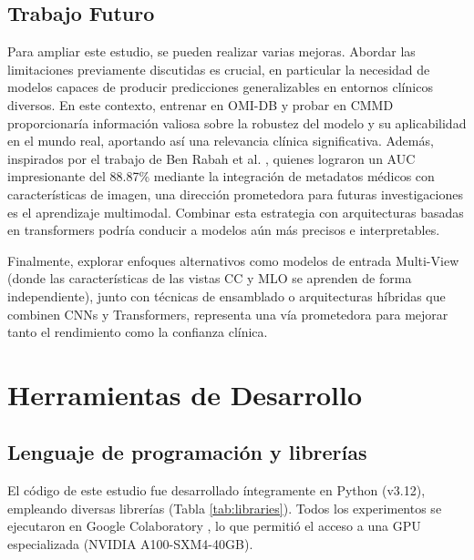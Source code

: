 \documentclass[a4paper,10pt]{book}
\begin{document}
\section{Trabajo Futuro}

Para ampliar este estudio, se pueden realizar varias mejoras. Abordar las limitaciones previamente discutidas es crucial, en particular la necesidad de modelos capaces de producir predicciones generalizables en entornos clínicos diversos. En este contexto, entrenar en OMI-DB y probar en CMMD proporcionaría información valiosa sobre la robustez del modelo y su aplicabilidad en el mundo real, aportando así una relevancia clínica significativa. Además, inspirados por el trabajo de Ben Rabah et al. \cite{ben_rabah_multimodal_2025}, quienes lograron un AUC impresionante del 88.87\% mediante la integración de metadatos médicos con características de imagen, una dirección prometedora para futuras investigaciones es el aprendizaje multimodal. Combinar esta estrategia con arquitecturas basadas en transformers podría conducir a modelos aún más precisos e interpretables.

Finalmente, explorar enfoques alternativos como modelos de entrada Multi-View (donde las características de las vistas CC y MLO se aprenden de forma independiente), junto con técnicas de ensamblado o arquitecturas híbridas que combinen CNNs y Transformers, representa una vía prometedora para mejorar tanto el rendimiento como la confianza clínica.

\appendix

\chapter{Herramientas de Desarrollo}

\section{Lenguaje de programación y librerías}

El código de este estudio fue desarrollado íntegramente en Python (v3.12), empleando diversas librerías (Tabla \ref{tab:libraries}). Todos los experimentos se ejecutaron en Google Colaboratory \cite{GoogleColab}, lo que permitió el acceso a una GPU especializada (NVIDIA A100-SXM4-40GB).
\end{document}
